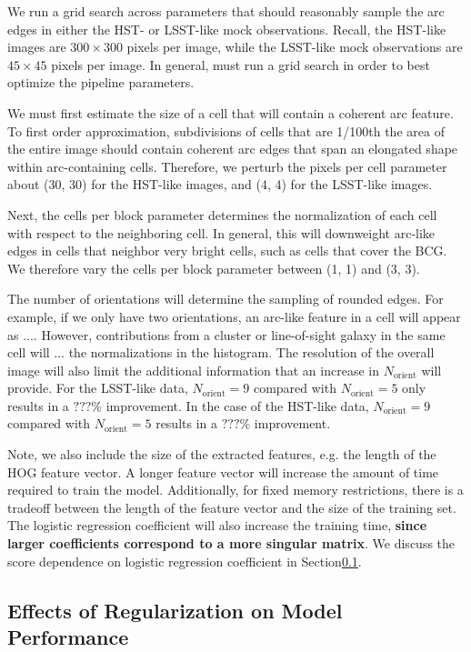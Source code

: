 \documentclass{emulateapj}
\newcommand{\todo}[1]{{\bf\color{blue} #1}}
\begin{document}
We run a grid search across parameters that should reasonably sample
the arc edges in either the HST- or LSST-like mock observations.
Recall, the HST-like images are $300\times300$ pixels per image, while
the LSST-like mock observations are $45\times45$ pixels per image.  In
general, must run a grid search in order to best optimize the pipeline
parameters.

We must first estimate the size of a cell that will contain a coherent
arc feature.  To first order approximation, subdivisions of cells that
are 1/100th the area of the entire image should contain coherent arc
edges that span an elongated shape within arc-containing cells.
Therefore, we perturb the pixels per cell parameter about (30, 30) for
the HST-like images, and (4, 4) for the LSST-like images.

Next, the cells per block parameter determines the normalization of
each cell with respect to the neighboring cell.  In general, this will
downweight arc-like edges in cells that neighbor very bright cells,
such as cells that cover the BCG.  We therefore vary the cells per
block parameter between (1, 1) and (3, 3).

The number of orientations will determine the sampling of rounded
edges.  For example, if we only have two orientations, an arc-like
feature in a cell will appear as .... However, contributions from a
cluster or line-of-sight galaxy in the same cell will ... the
normalizations in the histogram.  The resolution of the overall image
will also limit the additional information that an increase in
$N_\text{orient}$ will provide.  For the LSST-like data,
$N_\text{orient}=9$ compared with $N_\text{orient}=5$ only
results in a $???\%$ improvement.  In the case of the HST-like data,
$N_\text{orient}=9$ compared with $N_\text{orient}=5$
results in a $???\%$ improvement.

Note, we also include the size of the extracted features, e.g. the
length of the HOG feature vector.  A longer feature vector will
increase the amount of time required to train the model.
Additionally, for fixed memory restrictions, there is a tradeoff
between the length of the feature vector and the size of the training
set.  The logistic regression coefficient will also increase the
training time, \todo{since larger coefficients correspond to a more
  singular matrix}.  We discuss the score dependence on logistic
regression coefficient in Section\ref{sec:unregularizedfit}.

\subsection{Effects of Regularization on Model Performance}\label{sec:unregularizedfit}
\end{document}
